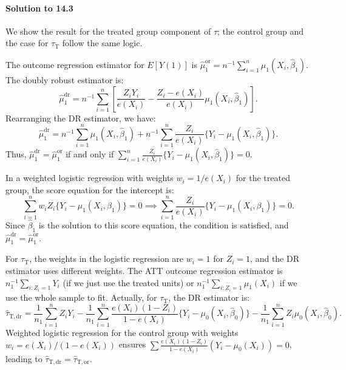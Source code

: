 \documentclass[krantz1]{krantz}
\def\Paragraph{\paragraph}
\begin{document}
\Paragraph{Solution to 14.3}

We show the result for the treated group component of $\tau$; the control group and the case for $\tau_\mathrm{T}$ follow the same logic. 

The outcome regression estimator for $E[Y(1)]$ is $\hat{\mu}_1^{\mathrm{or}} = n^{-1} \sum_{i=1}^n \mu_1(X_i, \hat{\beta}_1)$. 
The doubly robust estimator is:
\begin{equation*}
    \hat{\mu}_1^{\mathrm{dr}} = n^{-1} \sum_{i=1}^n \left[ \frac{Z_i Y_i}{e(X_i)} - \frac{Z_i - e(X_i)}{e(X_i)} \mu_1(X_i, \hat{\beta}_1) \right].
\end{equation*}
Rearranging the DR estimator, we have:
\begin{equation*}
    \hat{\mu}_1^{\mathrm{dr}} = n^{-1} \sum_{i=1}^n \mu_1(X_i, \hat{\beta}_1) + n^{-1} \sum_{i=1}^n \frac{Z_i}{e(X_i)} \{ Y_i - \mu_1(X_i, \hat{\beta}_1) \}.
\end{equation*}
Thus, $\hat{\mu}_1^{\mathrm{dr}} = \hat{\mu}_1^{\mathrm{or}}$ if and only if $\sum_{i=1}^n \frac{Z_i}{e(X_i)} \{ Y_i - \mu_1(X_i, \hat{\beta}_1) \} = 0$.

In a weighted logistic regression with weights $w_i = 1/e(X_i)$ for the treated group, the score equation for the intercept is:
\begin{equation*}
    \sum_{i=1}^n w_i Z_i \{ Y_i - \mu_1(X_i, \beta_1) \} = 0 \implies \sum_{i=1}^n \frac{Z_i}{e(X_i)} \{ Y_i - \mu_1(X_i, \beta_1) \} = 0.
\end{equation*}
Since $\hat{\beta}_1$ is the solution to this score equation, the condition is satisfied, and $\hat{\mu}_1^{\mathrm{dr}} = \hat{\mu}_1^{\mathrm{or}}$.

For $\tau_\mathrm{T}$, the weights in the logistic regression are $w_i = 1$ for $Z_i=1$, and the DR estimator uses different weights. The ATT outcome regression estimator is $n_1^{-1} \sum_{i: Z_i=1} Y_i$ (if we just use the treated units) or $n_1^{-1} \sum_{i: Z_i=1} \mu_1(X_i)$ if we use the whole sample to fit. Actually, for $\tau_\mathrm{T}$, the DR estimator is:
\begin{equation*}
    \hat{\tau}_{\mathrm{T, dr}} = \frac{1}{n_1} \sum_{i=1}^n Z_i Y_i - \frac{1}{n_1} \sum_{i=1}^n \frac{e(X_i)(1-Z_i)}{1-e(X_i)} \{ Y_i - \mu_0(X_i, \hat{\beta}_0) \} - \frac{1}{n_1} \sum_{i=1}^n Z_i \mu_0(X_i, \hat{\beta}_0).
\end{equation*}
Weighted logistic regression for the control group with weights $w_i = e(X_i)/(1-e(X_i))$ ensures $\sum \frac{e(X_i)(1-Z_i)}{1-e(X_i)} (Y_i - \mu_0(X_i)) = 0$, leading to $\hat{\tau}_{\mathrm{T, dr}} = \hat{\tau}_{\mathrm{T, or}}$.
\end{document}
